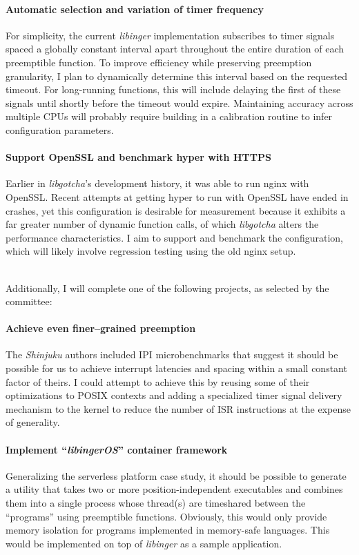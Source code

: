 \documentclass[12pt,letterpaper]{book}
\begin{document}
\paragraph{Automatic selection and variation of timer frequency}
For simplicity, the current \textit{libinger} implementation subscribes to timer
signals spaced a globally constant interval apart throughout the entire duration of
each preemptible function.  To improve efficiency while preserving preemption
granularity, I plan to dynamically determine this interval based on the requested
timeout.  For long-running functions, this will include delaying the first of these
signals until shortly before the timeout would expire.  Maintaining accuracy across
multiple CPUs will probably require building in a calibration routine to infer
configuration parameters.

\paragraph{Support OpenSSL and benchmark hyper with HTTPS}
Earlier in \textit{libgotcha}'s development history, it was able to run nginx with
OpenSSL.  Recent attempts at getting hyper to run with OpenSSL have ended in crashes,
yet this configuration is desirable for measurement because it exhibits a far greater
number of dynamic function calls, of which \textit{libgotcha} alters the performance
characteristics.  I aim to support and benchmark the configuration, which will likely
involve regression testing using the old nginx setup.

\hfill \\
\noindent
Additionally, I will complete one of the following projects, as selected by the
committee:

\paragraph{Achieve even finer--grained preemption}
The \textit{Shinjuku} authors included IPI microbenchmarks that suggest it should be
possible for us to achieve interrupt latencies and spacing within a small constant
factor of theirs.  I could attempt to achieve this by reusing some of their
optimizations to POSIX contexts and adding a specialized timer signal delivery
mechanism to the kernel to reduce the number of ISR instructions at the expense of
generality.

\paragraph{Implement ``\textit{libingerOS}'' container framework}
Generalizing the serverless platform case study, it should be possible to generate a
utility that takes two or more position-independent executables and combines them
into a single process whose thread(s) are timeshared between the ``programs'' using
preemptible functions.  Obviously, this would only provide memory isolation for
programs implemented in memory-safe languages.  This would be implemented on top of
\textit{libinger} as a sample application.
\end{document}
